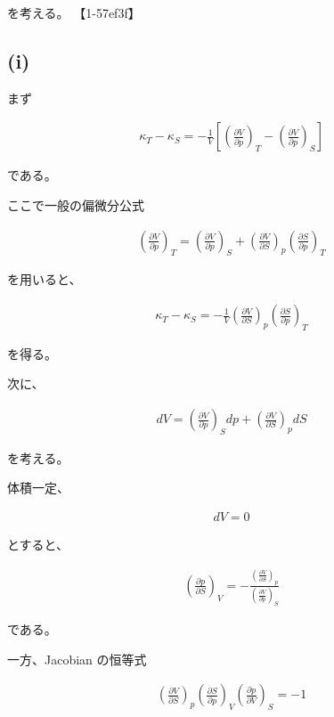 \documentclass[platex,dvipdfmx,a4paper]{jsarticle}
\begin{document}
を考える。 【1-57ef3f】

\subsection{(i)}

まず

\begin{align*}
\kappa_T-\kappa_S
=
-\frac1V
\left[
\left(
\frac{\partial V}{\partial p}
\right)_T
-
\left(
\frac{\partial V}{\partial p}
\right)_S
\right]
\end{align*}

である。

ここで一般の偏微分公式

\begin{align*}
\left(
\frac{\partial V}{\partial p}
\right)_T
=
\left(
\frac{\partial V}{\partial p}
\right)_S
+
\left(
\frac{\partial V}{\partial S}
\right)_p
\left(
\frac{\partial S}{\partial p}
\right)_T
\end{align*}

を用いると、

\begin{align*}
\kappa_T-\kappa_S
=
-\frac1V
\left(
\frac{\partial V}{\partial S}
\right)_p
\left(
\frac{\partial S}{\partial p}
\right)_T
\end{align*}

を得る。

次に、

\begin{align*}
dV
=
\left(
\frac{\partial V}{\partial p}
\right)_S dp
+
\left(
\frac{\partial V}{\partial S}
\right)_p dS
\end{align*}

を考える。

体積一定、

\begin{align*}
dV=0
\end{align*}

とすると、

\begin{align*}
\left(
\frac{\partial p}{\partial S}
\right)_V
=
-
\frac{
\left(
\frac{\partial V}{\partial S}
\right)_p
}{
\left(
\frac{\partial V}{\partial p}
\right)_S
}
\end{align*}

である。

一方、Jacobian の恒等式

\begin{align*}
\left(
\frac{\partial V}{\partial S}
\right)_p
\left(
\frac{\partial S}{\partial p}
\right)_V
\left(
\frac{\partial p}{\partial V}
\right)_S
=
-1
\end{align*}
\end{document}
